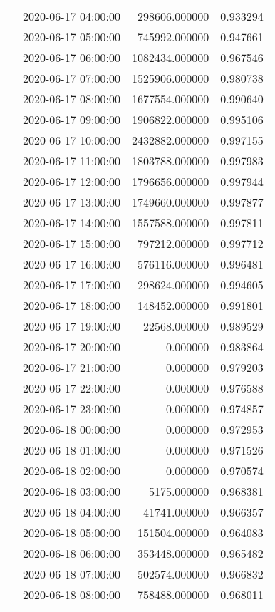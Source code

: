\begin{tabular}{llrr}
 & 2020-06-17 04:00:00 & 298606.000000 & 0.933294 \\
 & 2020-06-17 05:00:00 & 745992.000000 & 0.947661 \\
 & 2020-06-17 06:00:00 & 1082434.000000 & 0.967546 \\
 & 2020-06-17 07:00:00 & 1525906.000000 & 0.980738 \\
 & 2020-06-17 08:00:00 & 1677554.000000 & 0.990640 \\
 & 2020-06-17 09:00:00 & 1906822.000000 & 0.995106 \\
 & 2020-06-17 10:00:00 & 2432882.000000 & 0.997155 \\
 & 2020-06-17 11:00:00 & 1803788.000000 & 0.997983 \\
 & 2020-06-17 12:00:00 & 1796656.000000 & 0.997944 \\
 & 2020-06-17 13:00:00 & 1749660.000000 & 0.997877 \\
 & 2020-06-17 14:00:00 & 1557588.000000 & 0.997811 \\
 & 2020-06-17 15:00:00 & 797212.000000 & 0.997712 \\
 & 2020-06-17 16:00:00 & 576116.000000 & 0.996481 \\
 & 2020-06-17 17:00:00 & 298624.000000 & 0.994605 \\
 & 2020-06-17 18:00:00 & 148452.000000 & 0.991801 \\
 & 2020-06-17 19:00:00 & 22568.000000 & 0.989529 \\
 & 2020-06-17 20:00:00 & 0.000000 & 0.983864 \\
 & 2020-06-17 21:00:00 & 0.000000 & 0.979203 \\
 & 2020-06-17 22:00:00 & 0.000000 & 0.976588 \\
 & 2020-06-17 23:00:00 & 0.000000 & 0.974857 \\
 & 2020-06-18 00:00:00 & 0.000000 & 0.972953 \\
 & 2020-06-18 01:00:00 & 0.000000 & 0.971526 \\
 & 2020-06-18 02:00:00 & 0.000000 & 0.970574 \\
 & 2020-06-18 03:00:00 & 5175.000000 & 0.968381 \\
 & 2020-06-18 04:00:00 & 41741.000000 & 0.966357 \\
 & 2020-06-18 05:00:00 & 151504.000000 & 0.964083 \\
 & 2020-06-18 06:00:00 & 353448.000000 & 0.965482 \\
 & 2020-06-18 07:00:00 & 502574.000000 & 0.966832 \\
 & 2020-06-18 08:00:00 & 758488.000000 & 0.968011 \\

\end{tabular}
